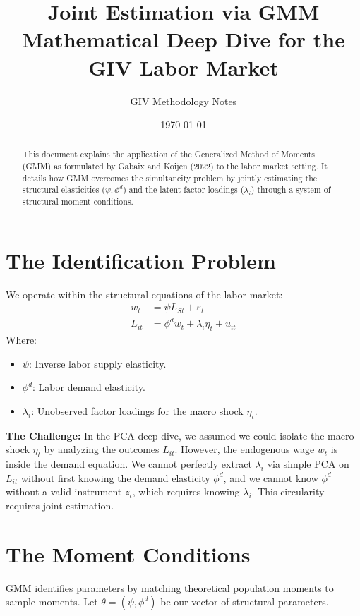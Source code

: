 \documentclass[11pt]{article}
\title{\color{DeepNavy}\huge Joint Estimation via GMM\\ \large Mathematical Deep Dive for the GIV Labor Market}
\author{GIV Methodology Notes}
\date{\today}
\begin{document}
\maketitle

\begin{abstract}
This document explains the application of the Generalized Method of Moments (GMM) as formulated by Gabaix and Koijen (2022) to the labor market setting. It details how GMM overcomes the simultaneity problem by jointly estimating the structural elasticities ($\psi, \phi^d$) and the latent factor loadings ($\lambda_i$) through a system of structural moment conditions.
\end{abstract}

\section{The Identification Problem}
We operate within the structural equations of the labor market:
\begin{align}
    w_t &= \psi L_{St} + \varepsilon_t \tag{Supply} \label{eq:supply} \\
    L_{it} &= \phi^d w_t + \lambda_i \eta_t + u_{it} \tag{Demand} \label{eq:demand}
\end{align}
Where:
\begin{itemize}
    \item $\psi$: Inverse labor supply elasticity.
    \item $\phi^d$: Labor demand elasticity.
    \item $\lambda_i$: Unobserved factor loadings for the macro shock $\eta_t$.
\end{itemize}

\textbf{The Challenge:} In the PCA deep-dive, we assumed we could isolate the macro shock $\eta_t$ by analyzing the outcomes $L_{it}$. However, the endogenous wage $w_t$ is inside the demand equation. We cannot perfectly extract $\lambda_i$ via simple PCA on $L_{it}$ without first knowing the demand elasticity $\phi^d$, and we cannot know $\phi^d$ without a valid instrument $z_t$, which requires knowing $\lambda_i$. This circularity requires joint estimation.

\section{The Moment Conditions}
GMM identifies parameters by matching theoretical population moments to sample moments. Let $\theta = (\psi, \phi^d)$ be our vector of structural parameters. 
\end{document}
